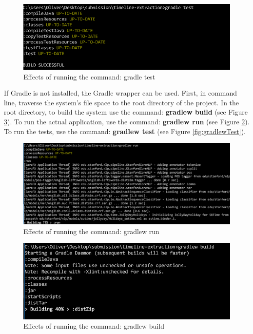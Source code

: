 \begin{figure}[H]
\caption{Effects of running the command: gradle test}
\label{fig:gradleTest}
\includegraphics{gradleTest.PNG}
\centering
\end{figure}

\par If Gradle is not installed, the Gradle wrapper can be used. First, in command line, traverse the system's file space to the root directory of the project. In the root directory, to build the system use the command: \textbf{gradlew build} (see Figure \ref{fig:gradlewBuild}). To run the actual application, use the command: \textbf{gradlew run} (see Figure \ref{fig:gradlewRun}). To run the tests, use the command: \textbf{gradlew test} (see Figure \ref{fig:gradlewTest}).

\begin{figure}[H]
\caption{Effects of running the command: gradlew run}
\label{fig:gradlewRun}
\includegraphics[width=\linewidth]{gradlewRun.PNG}
\centering
\end{figure}

\begin{figure}[H]
\caption{Effects of running the command: gradlew build}
\label{fig:gradlewBuild}
\includegraphics{downloadingLibraries.PNG}
\centering
\end{figure}

